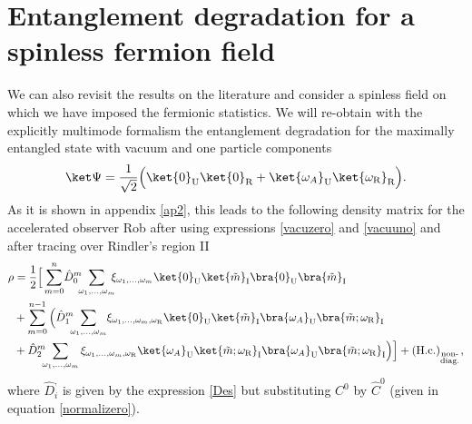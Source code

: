 \section{Entanglement degradation for a spinless fermion field}\label{caso3}

We can also revisit the results on the literature \cite{AlsingSchul} and consider a spinless field on which we have imposed the fermionic statistics. We will re-obtain with the explicitly multimode formalism the entanglement degradation for the maximally entangled state with vacuum and one particle components
\begin{equation}\label{minkowstate3}
\ket\Psi=\frac{1}{\sqrt{2}}\Big(\ket{0}_{\text{U}}\ket{0}_\text{R}+\ket{\omega_A}_{\text{U}}\ket{\omega_\text{R}}_\text{R}\Big).
\end{equation}
As it is shown in appendix \ref{ap2}, this leads to the following density matrix for the accelerated observer Rob after using expressions \eqref{vacuzero} and \eqref{vacuuno} and after tracing over Rindler's region II 
\begin{align}\label{densmat3}
\nonumber\rho&=\frac{1}{2}\Big[\sum_{m=0}^{n}\!\hat D_{0}^m\!\!\!\sum_{\omega_1,\dots,\omega_m}\!\!\!\xi_{\omega_1,\dots,\omega_m}\ket{0}_{\text{U}}\ket{\tilde m}_\text{I}\bra{0}_{\text{U}}\bra{\tilde m}_\text{I}\\*
\nonumber&+
\sum_{m=0}^{n-1}\Big(\hat D_{1}^m\!\!\!\sum_{\omega_1,\dots,\omega_m}\!\xi_{\omega_1,\dots,\omega_m,\omega_\text{R}}\ket{0}_{\text{U}}\ket{\tilde m}_\text{I}\bra{\omega_A}_{\text{U}}\bra{\tilde m;\omega_\text{R}}_\text{I}\\
 &+\hat D_{2}^m\!\!\!\sum_{\omega_1,\dots,\omega_m}\xi_{\omega_1,\dots,\omega_m,\omega_\text{R}}\ket{\omega_A}_{\text{U}}\ket{\tilde m;\omega_\text{R}}_\text{I}\bra{\omega_A}_{\text{U}}\bra{\tilde m;\omega_\text{R}}_\text{I}\Big)\Big]+(\text{H.c.})_{_{\substack{\text{non-}\\\text{diag.}}}},
\end{align}
where $\hat D^,_i$ is given by the expression \eqref{Des} but substituting $C^0$ by $\hat C^0$ (given in equation \eqref{normalizero}). 

